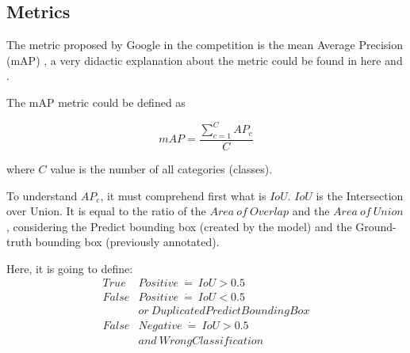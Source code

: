 \documentclass[11pt, a4paper, twocolumn]{article}
\begin{document}
\subsection{Metrics}

The metric proposed by Google in the competition is the mean Average Precision (mAP) \cite{map}, a very didactic explanation about the metric could be found in here \cite{medium:1} and \cite{medium:2}.

The mAP metric could be defined as

{\centering
	\begin{equation*}
	mAP = \frac{\sum\limits_{c=1}^{C}AP_c} {C}
	\end{equation*}}

where $C$ value is the number of all categories (classes).

To understand $AP_c$, it must comprehend first what is $IoU$. $IoU$ is the Intersection over Union. It is equal to the ratio of the $Area\ of\ Overlap$ and the $Area\ of\ Union$, considering the Predict bounding box (created by the model) and the Ground-truth bounding box (previously annotated).


\begin{figure}[!ht]
	\centering
	\qquad
	\label{fig:example}%
\end{figure}

Here, it is going to define:
\begin{align*}
True&Positive\ \dot=\ IoU > 0.5 \\
False&Positive\ \dot=\ IoU < 0.5 \\
&or\ DuplicatedPredictBoundingBox \\
False&Negative\ \dot=\ IoU > 0.5\ \\ 
&and \ WrongClassification
\end{align*}
\end{document}
